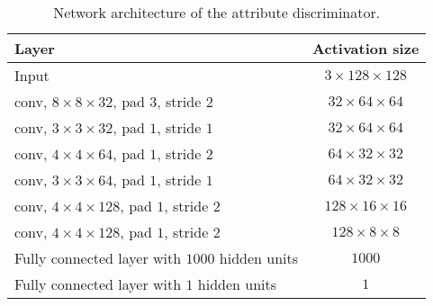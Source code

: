 \documentclass[journal]{IEEEtran}
\begin{document}
\begin{table}[htb]
\footnotesize
\caption{Network architecture of the attribute discriminator.}
\begin{center}
\begin{tabular}{l|c}
\hline
Layer&  Activation size  \\
\hline
Input& $3\times128\times128$ \\
conv, $8\times8\times32$, pad $3$,  stride $2$ & $32\times64\times64$ \\
conv, $3\times3\times32$, pad $1$,  stride $1$ & $32\times64\times64$ \\
conv, $4\times4\times64$, pad $1$,  stride $2$ & $64\times32\times32$ \\
conv, $3\times3\times64$, pad $1$,  stride $1$ & $64\times32\times32$ \\
conv, $4\times4\times128$, pad $1$, stride $2$ & $128\times16\times16$ \\
conv, $4\times4\times128$, pad $1$, stride $2$ & $128\times8\times8$ \\
Fully connected layer with $1000$ hidden units& $1000$ \\
Fully connected layer with $1$ hidden units & $1$ \\
\hline
\end{tabular}
\end{center}
\label{table:discriminator}
\end{table}
\end{document}
